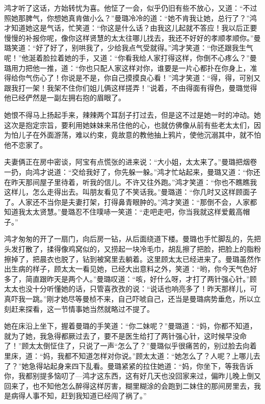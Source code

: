 \par 鸿才听了这话，方始转忧为喜。他怔了一会，似乎仍旧有些不放心，又道：“不过照她那脾气，你想她真肯做小么？”曼璐冷冷的道：“她不肯我让她，总行了？”鸿才知道她这是气话，忙笑道：“你这是什么话？由我这儿起就不答应！我以后正要慢慢的补报你呢，像你这样贤慧的太太往哪儿找去，我还不好好的孝顺孝顺你。”曼璐笑道：“好了好了，别哄我了，少给我点气受就得。”鸿才笑道：“你还跟我生气呢！”他涎着脸拉着她的手，又道：“你看我给人家打得这样，你倒不心疼么？”曼璐用力把他一推，道：“你也只配人家这样对你，谁要是一片心都扑在你身上，准得给你气伤心了！你说是不是，你自己摸摸良心看！”鸿才笑道：“得，得，可别又跟我打一架！我架不住你们姐儿俩这样搓弄！”说着，不由得面有得色，曼璐觉得他已经俨然是一副左拥右抱的眉眼了。
\par 她恨不得马上扬起手来，辣辣两个耳刮子打过去，但是这不过是她一时的冲动。她这次是抱定宗旨，要利用她妹妹来吊住他的心，也就仿佛像从前有些老太太们，因为怕儿子在外面游荡，难以约束，竟故意的教他抽上鸦片，使他沉溺其中，就不怕他不恋家了。
\par 夫妻俩正在房中密谈，阿宝有点慌张的进来说：“大小姐，太太来了。”曼璐把烟卷一扔，向鸿才说道：“交给我好了，你先躲一躲。”鸿才忙站起来，曼璐又道：“你还在昨天那间屋子里待着，听我的信儿。不许又往外跑。”鸿才笑道：“你也不瞧瞧我这样儿，怎么走得出去。叫朋友看见了不笑话我。”曼璐道：“你几时又这样顾面子了。人家还不当你是夫妻打架，打得鼻青眼肿的。”鸿才笑道：“那倒不会，人家都知道我太太贤慧。”曼璐忍不住噗哧一笑道：“走吧走吧，你当我就这样爱戴高帽子。”
\par 鸿才匆匆的开了一扇门，向后房一钻，从后面绕道下楼。曼璐也手忙脚乱的，先把头发打散了，揉得像鸡窝似的，又捞起一块冷毛巾，胡乱擦了把脸，把脸上的脂粉擦掉了，把晨衣也脱了，钻到被窝里去躺着。这里顾太太已经进来了。曼璐虽然作出生病的样子，顾太太一看见她，已经大出意料之外，笑道：“哟，你今天气色好多了，简直跟昨天是两个人。”曼璐叹道：“咳，好什么呀，才打了两针强心针。”顾太太也没十分听懂她的话，只管喜孜孜的说：“说话也响亮多了！昨天那样儿，可真吓我一跳。”刚才她尽等曼桢不来，自己吓唬自己，还当是曼璐病势垂危，所以立刻赶来探看，这一节情事她当然就略过不提了。
\par 她在床沿上坐下，握着曼璐的手笑道：“你二妹呢？”曼璐道：“妈，你都不知道，就为了她，我急得都厥过去了，要不是医生给打了两针强心针，这时候早没命了！”顾太太倒怔住了，只说了一声“怎么了？”曼璐似乎很痛苦的，别过脸去向着里床，道：“妈，我都不知道怎样对你说。”顾太太道：“她怎么了？人呢？上哪儿去了？”她急得站起身来四下乱看。曼璐紧紧的拉住她道：“妈，你坐下，等我告诉你，我都别提多恼叨了—鸿才这东西，这有好几天也没回家来过，偏昨儿晚上倒又回来了，也不知他怎么醉得这样厉害，糊里糊涂的会跑到二妹住的那间房里去，我是病得人事不知，赶到我知道已经闯了祸了。”

